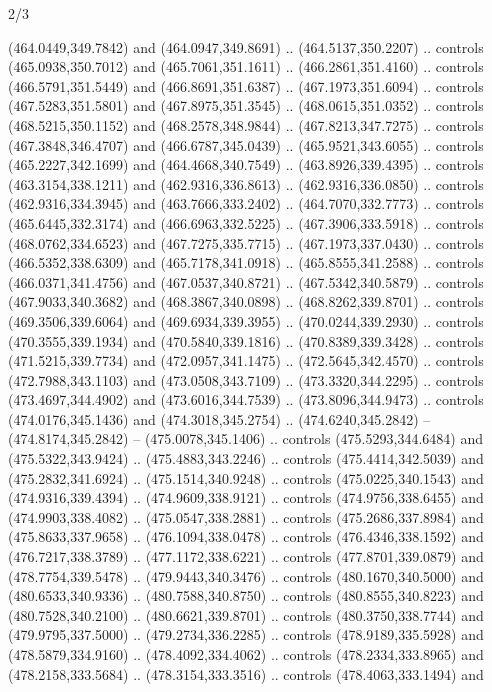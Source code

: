 \begin{flagdescription}{2/3}
\begin{scope}[xshift=0.5\flaglength,yshift=0.5\flagwidth,scale=\flagwidth/495.65]
\begin{scope}[y=0.8pt, x=0.8pt, yscale=-1,shift={(-463.76,-309.78)}]
  (464.0449,349.7842) and (464.0947,349.8691) .. (464.5137,350.2207) .. controls
  (465.0938,350.7012) and (465.7061,351.1611) .. (466.2861,351.4160) .. controls
  (466.5791,351.5449) and (466.8691,351.6387) .. (467.1973,351.6094) .. controls
  (467.5283,351.5801) and (467.8975,351.3545) .. (468.0615,351.0352) .. controls
  (468.5215,350.1152) and (468.2578,348.9844) .. (467.8213,347.7275) .. controls
  (467.3848,346.4707) and (466.6787,345.0439) .. (465.9521,343.6055) .. controls
  (465.2227,342.1699) and (464.4668,340.7549) .. (463.8926,339.4395) .. controls
  (463.3154,338.1211) and (462.9316,336.8613) .. (462.9316,336.0850) .. controls
  (462.9316,334.3945) and (463.7666,333.2402) .. (464.7070,332.7773) .. controls
  (465.6445,332.3174) and (466.6963,332.5225) .. (467.3906,333.5918) .. controls
  (468.0762,334.6523) and (467.7275,335.7715) .. (467.1973,337.0430) .. controls
  (466.5352,338.6309) and (465.7178,341.0918) .. (465.8555,341.2588) .. controls
  (466.0371,341.4756) and (467.0537,340.8721) .. (467.5342,340.5879) .. controls
  (467.9033,340.3682) and (468.3867,340.0898) .. (468.8262,339.8701) .. controls
  (469.3506,339.6064) and (469.6934,339.3955) .. (470.0244,339.2930) .. controls
  (470.3555,339.1934) and (470.5840,339.1816) .. (470.8389,339.3428) .. controls
  (471.5215,339.7734) and (472.0957,341.1475) .. (472.5645,342.4570) .. controls
  (472.7988,343.1103) and (473.0508,343.7109) .. (473.3320,344.2295) .. controls
  (473.4697,344.4902) and (473.6016,344.7539) .. (473.8096,344.9473) .. controls
  (474.0176,345.1436) and (474.3018,345.2754) .. (474.6240,345.2842) --
  (474.8174,345.2842) -- (475.0078,345.1406) .. controls (475.5293,344.6484) and
  (475.5322,343.9424) .. (475.4883,343.2246) .. controls (475.4414,342.5039) and
  (475.2832,341.6924) .. (475.1514,340.9248) .. controls (475.0225,340.1543) and
  (474.9316,339.4394) .. (474.9609,338.9121) .. controls (474.9756,338.6455) and
  (474.9903,338.4082) .. (475.0547,338.2881) .. controls (475.2686,337.8984) and
  (475.8633,337.9658) .. (476.1094,338.0478) .. controls (476.4346,338.1592) and
  (476.7217,338.3789) .. (477.1172,338.6221) .. controls (477.8701,339.0879) and
  (478.7754,339.5478) .. (479.9443,340.3476) .. controls (480.1670,340.5000) and
  (480.6533,340.9336) .. (480.7588,340.8750) .. controls (480.8555,340.8223) and
  (480.7528,340.2100) .. (480.6621,339.8701) .. controls (480.3750,338.7744) and
  (479.9795,337.5000) .. (479.2734,336.2285) .. controls (478.9189,335.5928) and
  (478.5879,334.9160) .. (478.4092,334.4062) .. controls (478.2334,333.8965) and
  (478.2158,333.5684) .. (478.3154,333.3516) .. controls (478.4063,333.1494) and

\end{scope}
\end{scope}
\end{flagdescription}
